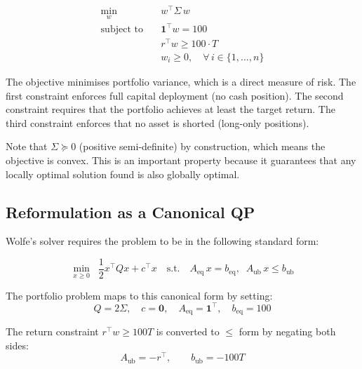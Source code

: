 \documentclass[conference]{IEEEtran}
\begin{document}
\begin{equation}
    \begin{aligned}
        \min_{w} \quad        & w^\top \Sigma\, w                                \\
        \text{subject to}\quad & \mathbf{1}^\top w = 100                          \\
                               & r^\top w \geq 100 \cdot T                        \\
                               & w_i \geq 0, \quad \forall\, i \in \{1,\dots,n\}
    \end{aligned}
    \label{eq:markowitz}
\end{equation}

The objective minimises portfolio variance, which is a direct measure of risk.
The first constraint enforces full capital deployment (no cash position). The
second constraint requires that the portfolio achieves at least the target
return. The third constraint enforces that no asset is shorted (long-only
positions).

Note that $\Sigma \succeq 0$ (positive semi-definite) by construction, which
means the objective is convex. This is an important property because it
guarantees that any locally optimal solution found is also globally optimal.

\subsection{Reformulation as a Canonical QP}

Wolfe's solver requires the problem to be in the following standard form:

\begin{equation}
    \min_{x \geq 0} \;\; \frac{1}{2} x^\top Q x + c^\top x
    \quad \text{s.t.} \quad
    A_{\text{eq}}\, x = b_{\text{eq}}, \;\;
    A_{\text{ub}}\, x \leq b_{\text{ub}}
    \label{eq:canonical_qp}
\end{equation}

The portfolio problem maps to this canonical form by setting:
\begin{equation}
    Q = 2\Sigma, \quad c = \mathbf{0}, \quad
    A_{\text{eq}} = \mathbf{1}^\top, \quad b_{\text{eq}} = 100
    \label{eq:qp_params}
\end{equation}

The return constraint $r^\top w \geq 100T$ is converted to $\leq$ form by
negating both sides:
\begin{equation}
    A_{\text{ub}} = -r^\top, \qquad b_{\text{ub}} = -100T
    \label{eq:return_ineq}
\end{equation}
\end{document}
